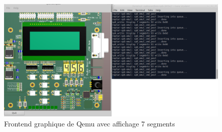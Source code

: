 \begin{figure}[H]
	\begin{center}
		\includegraphics[width=15cm]{img/emulation2.png}
		\caption{Frontend graphique de Qemu avec affichage 7 segments}
		\label{emulation2}
	\end{center}
\end{figure}
